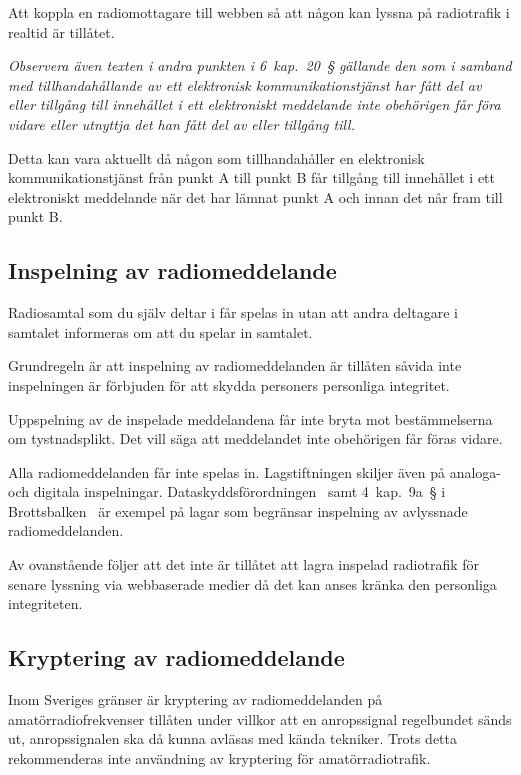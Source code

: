 Att koppla en radiomottagare till webben så att någon kan lyssna på radiotrafik
i realtid är tillåtet.

\emph{Observera även texten i andra punkten i 6~kap.~20~\S{} gällande den som i
	samband med tillhandahållande av ett elektronisk kommunikationstjänst har fått
	del av eller tillgång till innehållet i ett elektroniskt meddelande inte
	obehörigen får föra vidare eller utnyttja det han fått del av eller tillgång
	till.}

Detta kan vara aktuellt då någon som tillhandahåller en elektronisk
kommunikationstjänst från punkt A till punkt B får tillgång till innehållet i
ett elektroniskt meddelande när det har lämnat punkt A och innan det når fram
till punkt B.

\subsection{Inspelning av radiomeddelande}

Radiosamtal som du själv deltar i får spelas in utan att andra deltagare i
samtalet informeras om att du spelar in samtalet.

Grundregeln är att inspelning av radiomeddelanden är tillåten såvida inte
inspelningen är förbjuden för att skydda personers personliga integritet.

Uppspelning av de inspelade meddelandena får inte bryta mot bestämmelserna om
tystnadsplikt.
Det vill säga att meddelandet inte obehörigen får föras vidare.

Alla radiomeddelanden får inte spelas in.
Lagstiftningen skiljer även på analoga- och digitala inspelningar.
Dataskyddsförordningen~\cite{GDPR} samt 4~kap.~9a~\S{} i
Brottsbalken~\cite{SFS1962:700} är exempel på lagar som begränsar inspelning av
avlyssnade radiomeddelanden.

Av ovanstående följer att det inte är tillåtet att lagra inspelad radiotrafik
för senare lyssning via webbaserade medier då det kan anses kränka den
personliga integriteten.

\subsection{Kryptering av radiomeddelande}
\label{kryptering av radiomeddelande}

Inom Sveriges gränser är kryptering av radiomeddelanden på amatörradiofrekvenser
tillåten under villkor att en anropssignal regelbundet sänds ut, anropssignalen
ska då kunna avläsas med kända tekniker.
Trots detta rekommenderas inte användning av kryptering för amatörradiotrafik.

